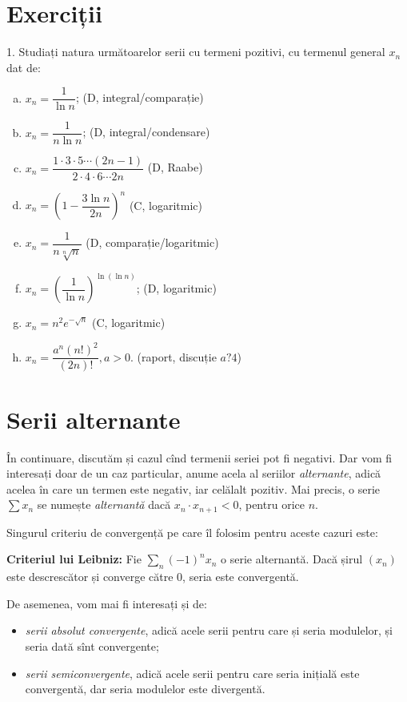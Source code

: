 \section{Exerciții}

1. Studiați natura următoarelor serii cu termeni pozitivi, cu termenul
general $ x_n $ dat de:
\begin{enumerate}[(a)]
    \item $ x_n = \dfrac{1}{\ln n} $; \hfill(D, integral/comparație)
    \item $ x_n = \dfrac{1}{n \ln n} $; \hfill(D, integral/condensare)
    \item $ x_n = \dfrac{1 \cdot 3 \cdot 5 \cdots (2n - 1)}{2 \cdot 4 \cdot 6 \cdots 2n} $ \hfill(D, Raabe)
    \item $ x_n = \left( 1 - \dfrac{3 \ln n}{2n} \right)^n $ \hfill(C, logaritmic)
    \item $ x_n = \dfrac{1}{n \sqrt[n]{n}} $ \hfill(D, comparație/logaritmic)
    \item $ x_n = \left( \dfrac{1}{\ln n} \right)^{\ln(\ln n)} $; \hfill(D, logaritmic)
    \item $ x_n = n^2 e^{-\sqrt{n}} $ \hfill(C, logaritmic)
    \item $ x_n = \dfrac{a^n (n!)^2}{(2n)!}, a > 0. $ \hfill(raport, discuție $ a ? 4 $)
\end{enumerate}

\section{Serii alternante}

În continuare, discutăm și cazul cînd termenii seriei pot fi negativi. Dar
vom fi interesați doar de un caz particular, anume acela al seriilor \emph{alternante},
adică acelea în care un termen este negativ, iar celălalt pozitiv. Mai precis,
o serie $ \sum x_n $ se numește \emph{alternantă} dacă $ x_n \cdot x_{n+1} < 0 $, 
pentru orice $ n $.

Singurul criteriu de convergență pe care îl folosim pentru aceste cazuri este:

\textbf{Criteriul lui Leibniz:} Fie $ \sum_n (-1)^n x_n $ o serie
alternantă. Dacă șirul $ (x_n) $ este descrescător și converge către 0,
seria este convergentă.

De asemenea, vom mai fi interesați și de:
\begin{itemize}
    \item \emph{serii absolut convergente}, adică acele serii pentru care și
        seria modulelor, și seria dată sînt convergente;
    \item \emph{serii semiconvergente}, adică acele serii pentru care seria
        inițială este convergentă, dar seria modulelor este divergentă.
\end{itemize}

